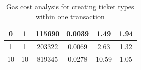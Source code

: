 \begin{table}[ht]
\begin{tabular}{|c|c|c|c|c|c|}
{ 0}                                                                    & { 1}                                                               & { 115690}                                                       & { 0.0039}                                                        & { 1.49}                                                          & { 1.94}                                                                          \\ \hline
{ 1}                                                                    & { 1}                                                               & { 203322}                                                       & { 0.0069}                                                        & { 2.63}                                                          & { 1.32}                                                                          \\ \hline
{ 10}                                                                   & { 10}                                                              & { 819345}                                                       & { 0.0278}                                                        & { 10.59}                                                         & { 1.05}                                                                          \\ \hline
\end{tabular}                    
\caption{Gas cost analysis for creating ticket types within one transaction}
\label{tab:gas-cost-ticket-types}
\end{table}


